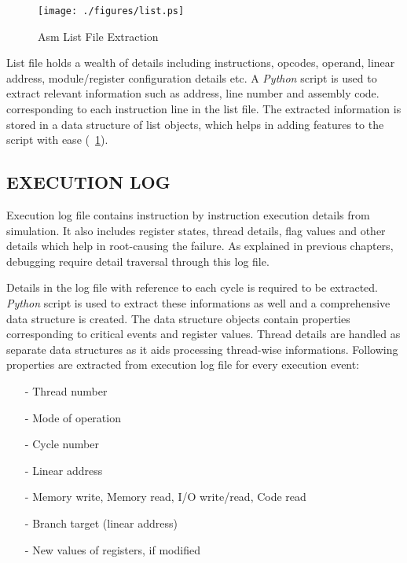 \begin{figure}[h]
\centering
\texttt{[image: ./figures/list.ps]}
\caption{Asm List File Extraction}
\label{impl.tex:listextr}
\end{figure}

List file holds a wealth of details including instructions, opcodes, operand, linear address, module/register configuration details etc. A {\it Python} script is used to extract relevant information such as address, line number and assembly code. corresponding to each instruction line in the list file.
The extracted information is stored in a data structure of list objects, which helps in adding features to the script with ease (\figurename{~\ref{impl.tex:listextr}}). 

\subsection {EXECUTION LOG}
Execution log file contains instruction by instruction execution details from simulation. It also includes register states, thread details, flag values and other details which help in root-causing the failure. As explained in previous chapters, debugging require detail traversal through this log file. 

Details in the log file with reference to each cycle is required to be extracted. {\it Python} script is used to extract these informations as well and a comprehensive data structure is created. The data structure objects contain properties corresponding to critical events and register values. Thread details are handled as separate data structures as it aids processing thread-wise informations. Following properties are extracted from execution log file for every execution event:


\begin{itemize}
 \item[-]  Thread number
 \item[-]  Mode of operation
 \item[-]  Cycle number
 \item[-]  Linear address
 \item[-]  Memory write, Memory read, I/O write/read, Code read
 \item[-]  Branch target (linear address)
 \item[-]  New values of registers, if modified
\end{itemize}


